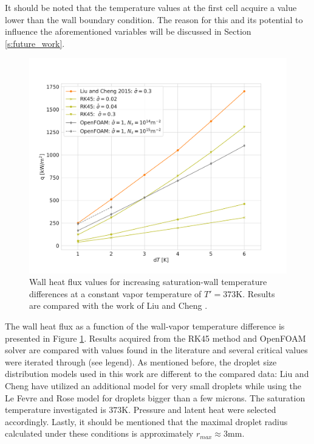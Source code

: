 \documentclass[12pt]{article}
\numberwithin{equation}{section}
\begin{document}
It should be noted that the temperature values at the first cell acquire a value lower than the wall boundary condition. The reason for this and its potential to influence the aforementioned variables will be discussed in Section \ref{s:future_work}. 
\begin{figure}[H]
    \centering
    \includegraphics[trim={0 20 0 70},clip,width=1\textwidth]{Figures/heatflux_compare.pdf}
    \caption{Wall heat flux values for increasing saturation-wall temperature differences at a constant vapor temperature of $T'=373\mathrm{K}$. Results are compared with the work of Liu and Cheng \cite{liu2015dropwise2}.}
    \label{f:heat_flux_compare}
\end{figure}
The wall heat flux as a function of the wall-vapor temperature difference is presented in Figure \ref{f:heat_flux_compare}. Results acquired from the RK45 method and OpenFOAM solver are compared with values found in the literature and several critical values were iterated through (see legend). As mentioned before, the droplet size distribution models used in this work are different to the compared data: Liu and Cheng \cite{liu2015dropwise} have utilized an additional model for very small droplets while using the Le Fevre and Rose model \cite{le1966theory} for droplets bigger than a few microns. The saturation temperature investigated is $373\mathrm{K}$. Pressure and latent heat were selected accordingly. Lastly, it should be mentioned that the maximal droplet radius calculated under these conditions is approximately $r_{max}\approx 3\mathrm{mm}$.
\end{document}
